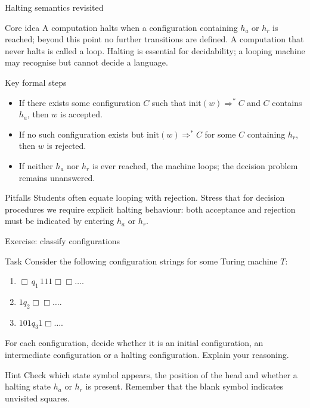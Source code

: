\begin{frame}[t]{Halting semantics revisited}
  \begin{tblock}{Core idea}
    A computation halts when a configuration containing $h_a$ or $h_r$ is
    reached; beyond this point no further transitions are defined.
    A computation that never halts is called a loop.  Halting is
    essential for decidability; a looping machine may recognise but
    cannot decide a language.
  \end{tblock}
  \begin{tblock}{Key formal steps}
    \begin{itemize}
      \item If there exists some configuration $C$ such that
        $\text{init}(w) \Rightarrow^* C$ and $C$ contains $h_a$, then
        $w$ is accepted.
      \item If no such configuration exists but $\text{init}(w)\Rightarrow^*
        C$ for some $C$ containing $h_r$, then $w$ is rejected.
      \item If neither $h_a$ nor $h_r$ is ever reached, the machine
        loops; the decision problem remains unanswered.
    \end{itemize}
  \end{tblock}
  \begin{talert}{Pitfalls}
    Students often equate looping with rejection.  Stress that for
    decision procedures we require explicit halting behaviour: both
    acceptance and rejection must be indicated by entering $h_a$ or
    $h_r$.
  \end{talert}
  \label{fr:7.1-13}
\end{frame}

\begin{frame}[t]{Exercise: classify configurations}
  \begin{tblock}{Task}
    Consider the following configuration strings for some Turing machine $T$:
    \begin{enumerate}
      \item $\mathrel{\Box}\,q_1\,111\Box\Box\dots$.
      \item $1q_2\Box\Box\dots$.
      \item $101q_3 1\Box\dots$.
    \end{enumerate}
    For each configuration, decide whether it is an initial
    configuration, an intermediate configuration or a halting
    configuration.  Explain your reasoning.
  \end{tblock}
  \begin{talert}{Hint}
    Check which state symbol appears, the position of the head and
    whether a halting state $h_a$ or $h_r$ is present.  Remember that
    the blank symbol indicates unvisited squares.
  \end{talert}
  \label{fr:7.1-14}
\end{frame}

